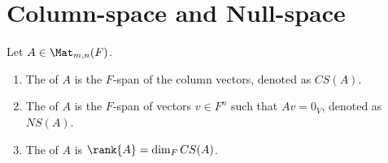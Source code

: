 \section{Column-space and Null-space}
    \begin{definition}
        Let $A \in \Mat_{m,n}(F)$.
            \begin{enumerate}[label = (\arabic*)]
                \item The  of $A$ is the $F$-span of the column vectors, denoted as $CS(A)$.
                \item The  of $A$ is the $F$-span of vectors $v \in F^n$ such that $Av = 0_V$, denoted as $NS(A)$.
                \item The  of $A$ is $\rank{A} = \dim_F{CS(A)}$.
            \end{enumerate}
    \end{definition}

